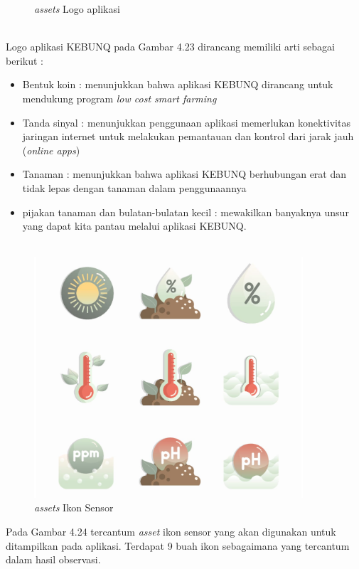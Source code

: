 \begin{flushleft}
\begin{justify}
\begin{enumerate}
\begin{figure}[ht]
                \caption{\textit{assets} Logo aplikasi}
            \end{figure}
            \noindent \\Logo aplikasi KEBUNQ pada Gambar 4.23 dirancang memiliki arti sebagai berikut :
            \begin{itemize}
                \item Bentuk koin : menunjukkan bahwa aplikasi KEBUNQ dirancang untuk mendukung program \emph{low cost smart farming}
                \item Tanda sinyal : menunjukkan penggunaan aplikasi memerlukan konektivitas jaringan internet untuk melakukan pemantauan dan kontrol dari jarak jauh (\emph{online apps})
                \item Tanaman : menunjukkan bahwa aplikasi KEBUNQ berhubungan erat dan tidak lepas dengan tanaman dalam penggunaannya
                \item pijakan tanaman dan bulatan-bulatan kecil : mewakilkan banyaknya unsur yang dapat kita pantau melalui aplikasi KEBUNQ.\\\\
            \end{itemize}
            \begin{figure}[ht]
                \centering
                \includegraphics[width=10cm]{images/UI/ikon.png}
                \caption{\textit{assets} Ikon Sensor}
            \end{figure}
            \noindent Pada Gambar 4.24 tercantum \emph{asset} ikon sensor yang akan digunakan untuk ditampilkan pada aplikasi. Terdapat 9 buah ikon sebagaimana yang tercantum dalam hasil observasi.
            \begin{figure}[ht]

\end{figure}
\end{enumerate}
\end{justify}
\end{flushleft}
